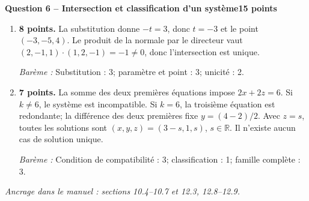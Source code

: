 \documentclass[11pt,a4paper]{article}
\begin{document}
\newpage
{\large\bfseries Question 6 -- Intersection et classification d’un système}\hfill\textbf{15 points}\par
\begin{enumerate}
\item \textbf{8 points.} La substitution donne \(-t=3\), donc \(t=-3\) et le point \((-3,-5,4)\). Le produit de la normale par le directeur vaut \((2,-1,1)\cdot(1,2,-1)=-1\ne0\), donc l’intersection est unique.
\par{\small\textit{Barème : }Substitution : 3; paramètre et point : 3; unicité : 2.}
\item \textbf{7 points.} La somme des deux premières équations impose \(2x+2z=6\). Si \(k\ne6\), le système est incompatible. Si \(k=6\), la troisième équation est redondante; la différence des deux premières fixe \(y=(4-2)/2\). Avec \(z=s\), toutes les solutions sont \((x,y,z)=(3-s,1,s)\), \(s\in\mathbb R\). Il n’existe aucun cas de solution unique.
\par{\small\textit{Barème : }Condition de compatibilité : 3; classification : 1; famille complète : 3.}
\end{enumerate}
\vfill {\small\textit{Ancrage dans le manuel : sections 10.4--10.7 et 12.3, 12.8--12.9.}}
\end{document}
